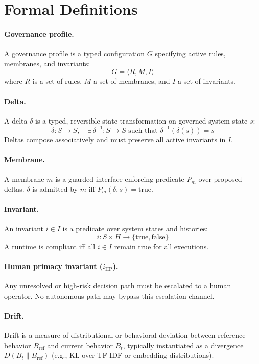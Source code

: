 \documentclass[11pt]{article}
\begin{document}
\section{Formal Definitions}

\paragraph{Governance profile.}
A governance profile is a typed configuration $G$ specifying active rules, membranes, and
invariants:
\[
G = \langle R, M, I \rangle
\]
where $R$ is a set of rules, $M$ a set of membranes, and $I$ a set of invariants.

\paragraph{Delta.}
A delta $\delta$ is a typed, reversible state transformation on governed system state $s$:
\[
\delta : S \to S, \quad \exists\,\delta^{-1} : S \to S \text{ such that } \delta^{-1}(\delta(s)) = s
\]
Deltas compose associatively and must preserve all active invariants in $I$.

\paragraph{Membrane.}
A membrane $m$ is a guarded interface enforcing predicate $P_m$ over proposed deltas.
$\delta$ is admitted by $m$ iff $P_m(\delta, s) = \mathrm{true}$.

\paragraph{Invariant.}
An invariant $i \in I$ is a predicate over system states and histories:
\[
i : S \times H \to \{\mathrm{true}, \mathrm{false}\}
\]
A runtime is compliant iff all $i \in I$ remain true for all executions.

\paragraph{Human primacy invariant ($i_{\mathrm{HP}}$).}
Any unresolved or high-risk decision path must be escalated to a human operator. No autonomous
path may bypass this escalation channel.

\paragraph{Drift.}
Drift is a measure of distributional or behavioral deviation between reference behavior
$B_{\mathrm{ref}}$ and current behavior $B_t$, typically instantiated as a divergence
$D(B_t \| B_{\mathrm{ref}})$ (e.g., KL over TF-IDF or embedding distributions).
\end{document}
